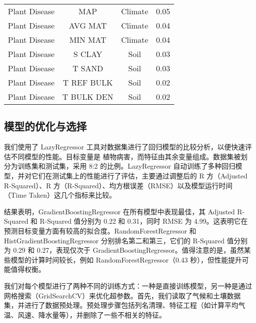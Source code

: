 \documentclass[AutoFakeBold]{LZUThesis-PgD&PhD}
\begin{document}
\begin{table}[H]
\begin{tabular}{cccc}
			Plant Disease & MAP & Climate & 0.05 \\
			Plant Disease & AVG MAT & Climate & 0.04 \\
			Plant Disease & MIN MAT & Climate & 0.04 \\
			Plant Disease & S CLAY & Soil & 0.03 \\
			Plant Disease & T SAND & Soil & 0.03 \\
			Plant Disease & T REF BULK & Soil & 0.02 \\
			Plant Disease & T BULK DEN & Soil & 0.02 \\
			\bottomrule
		\end{tabular}
	\end{table}
	
%		
	
	\subsection{模型的优化与选择}
	
	我们使用了 LazyRegressor 工具对数据集进行了回归模型的比较分析，以便快速评估不同模型的性能。目标变量是 植物病害，而特征由其余变量组成。数据集被划分为训练集和测试集，采用 8:2 的比例。LazyRegressor 自动训练了多种回归模型，并对它们在测试集上的性能进行了评估，主要通过调整后的 R 方（Adjusted R-Squared）、R 方（R-Squared）、均方根误差（RMSE）以及模型运行时间（Time Taken）这几个指标来比较。
	
	结果表明，GradientBoostingRegressor 在所有模型中表现最佳，其 Adjusted R-Squared 和 R-Squared 值分别为 0.22 和 0.31，同时 RMSE 为 4.99。这表明它在预测目标变量方面有较高的拟合度。RandomForestRegressor 和 HistGradientBoostingRegressor 分别排名第二和第三，它们的 R-Squared 值分别为 0.29 和 0.27，表现仅次于 GradientBoostingRegressor。值得注意的是，虽然某些模型的计算时间较长，例如 RandomForestRegressor（0.43 秒），但性能提升可能值得权衡。
	
	我们对每个模型进行了两种不同的训练方式：一种是直接训练模型，另一种是通过网格搜索（GridSearchCV）来优化超参数。首先，我们读取了气候和土壤数据集，并进行了数据预处理。预处理步骤包括列名清理、特征工程（如计算平均气温、风速、降水量等），并删除了一些不相关的特征。
	
\end{document}
